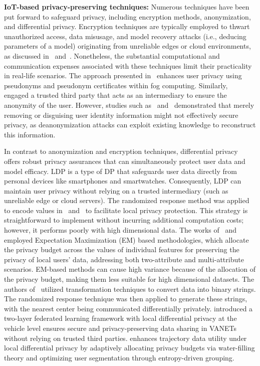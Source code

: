\textbf{IoT-based privacy-preserving techniques:}
Numerous techniques have been put forward to safeguard privacy, including encryption methods, anonymization, and differential privacy. Encryption techniques are typically employed to thwart unauthorized access, data misusage, and model recovery attacks (i.e., deducing parameters of a model) originating from unreliable edges or cloud environments, as discussed in~\cite{li2020attribute} and~\cite{li2020privacy}. Nonetheless, the substantial computational and communication expenses associated with these techniques limit their practicality in real-life scenarios. The approach presented in~\cite{guan2019appa} enhances user privacy using pseudonyms and pseudonym certificates within fog computing. Similarly,~\cite{zhao2021anonymous} engaged a trusted third party that acts as an intermediary to ensure the anonymity of the user. However, studies such as~\cite{qian2017social} and~\cite{narayanan2008robust} demonstrated that merely removing or disguising user identity information might not effectively secure privacy, as deanonymization attacks can exploit existing knowledge to reconstruct this information.

In contrast to anonymization and encryption techniques, differential privacy~\cite{dwork2014algorithmic} offers robust privacy assurances that can simultaneously protect user data and model efficacy. LDP is a type of DP that safeguards user data directly from personal devices like smartphones and smartwatches. Consequently, LDP can maintain user privacy without relying on a trusted intermediary (such as unreliable edge or cloud servers). The randomized response method was applied to encode values in~\cite{kairouz2016discrete} and~\cite{wang2017locally} to facilitate local privacy protection. This strategy is straightforward to implement without incurring additional computation costs; however, it performs poorly with high dimensional data. The works of~\cite{fanti2016building} and~\cite{ren2018textsf} employed Expectation Maximization (EM) based methodologies, which allocate the privacy budget across the values of individual features for preserving the privacy of local users’ data, addressing both two-attribute and multi-attribute scenarios. EM-based methods can cause high variance because of the allocation of the privacy budget, making them less suitable for high dimensional datasets. The authors of~\cite{xia2020distributed} utilized transformation techniques to convert data into binary strings. The randomized response technique was then applied to generate these strings, with the nearest center being communicated differentially privately. 
\cite{batool2024secure} introduced a two-layer federated learning framework with local differential privacy at the vehicle level ensures secure and privacy-preserving data sharing in VANETs without relying on trusted third parties.
\cite{li2025wf} enhances trajectory data utility under local differential privacy by adaptively allocating privacy budgets via water-filling theory and optimizing user segmentation through entropy-driven grouping.

